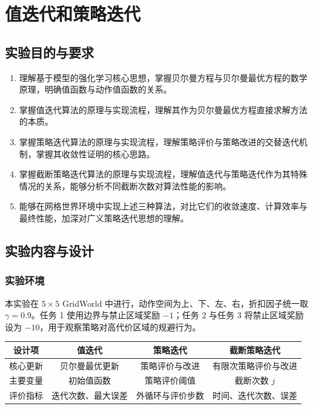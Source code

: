\documentclass[11pt,a4paper,UTF8]{ctexart}
\numberwithin{figure}{section}
\numberwithin{table}{section}
\begin{document}
\newpage
\pagestyle{plain}
\tableofcontents
\newpage
\pagestyle{fancy}

\newpage
\section{值迭代和策略迭代}
\subsection{实验目的与要求}

\begin{enumerate}
\item 理解基于模型的强化学习核心思想，掌握贝尔曼方程与贝尔曼最优方程的数学原理，明确值函数与动作值函数的关系。
\item 掌握值迭代算法的原理与实现流程，理解其作为贝尔曼最优方程直接求解方法的本质。
\item 掌握策略迭代算法的原理与实现流程，理解策略评价与策略改进的交替迭代机制，掌握其收敛性证明的核心思路。
\item 掌握截断策略迭代算法的原理与实现流程，理解值迭代与策略迭代作为其特殊情况的关系，能够分析不同截断次数对算法性能的影响。
\item 能够在网格世界环境中实现上述三种算法，对比它们的收敛速度、计算效率与最终性能，加深对广义策略迭代思想的理解。
\end{enumerate}
\subsection{实验内容与设计}

\subsubsection{实验环境}

本实验在 $5\times5$ GridWorld 中进行，动作空间为上、下、左、右，折扣因子统一取 $\gamma=0.9$。任务 1 使用边界与禁止区域奖励 $-1$；任务 2 与任务 3 将禁止区域奖励设为 $-10$，用于观察策略对高代价区域的规避行为。

\begin{table}[H]
\centering
\begin{tabular}{cccc}
\toprule
设计项 & 值迭代 & 策略迭代 & 截断策略迭代 \\
\midrule
核心更新 & 贝尔曼最优更新 & 策略评价与改进 & 有限次策略评价与改进 \\
主要变量 & 初始值函数 & 策略评价阈值 & 截断次数 $j$ \\
评价指标 & 迭代次数、最大误差 & 外循环与评价步数 & 时间、迭代次数、误差 \\
\bottomrule
\end{tabular}
\end{table}
\end{document}
